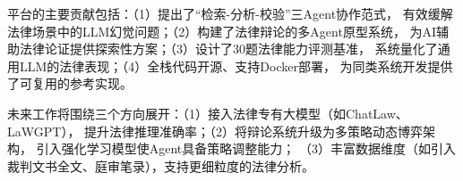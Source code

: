 \documentclass[12pt,a4paper,twoside]{ctexart}
\begin{document}
平台的主要贡献包括：（1）提出了``检索-分析-校验''三Agent协作范式，
有效缓解法律场景中的LLM幻觉问题；（2）构建了法律辩论的多Agent原型系统，
为AI辅助法律论证提供探索性方案；（3）设计了30题法律能力评测基准，
系统量化了通用LLM的法律表现；（4）全栈代码开源、支持Docker部署，
为同类系统开发提供了可复用的参考实现。

未来工作将围绕三个方向展开：（1）接入法律专有大模型（如ChatLaw、LaWGPT），
提升法律推理准确率；（2）将辩论系统升级为多策略动态博弈架构，
引入强化学习模型使Agent具备策略调整能力；
（3）丰富数据维度（如引入裁判文书全文、庭审笔录），支持更细粒度的法律分析。

\vspace{12pt}

\end{document}
